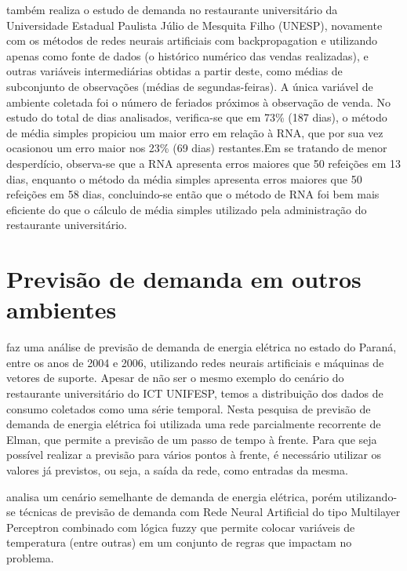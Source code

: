           também realiza o estudo de demanda no restaurante universitário da Universidade Estadual Paulista Júlio de Mesquita Filho (UNESP), novamente com os métodos de redes neurais artificiais com backpropagation e utilizando apenas como fonte de dados (o histórico numérico das vendas realizadas), e outras variáveis intermediárias obtidas a partir deste, como médias de subconjunto de observações (médias de segundas-feiras). A única variável de ambiente coletada foi o número de feriados próximos à observação de venda. No estudo do total de dias analisados, verifica-se que em 73\% (187 dias), o método de média simples propiciou um maior erro em relação à RNA, que por sua vez ocasionou um erro maior nos 23\% (69 dias) restantes.Em se tratando de menor desperdício, observa-se que a RNA apresenta erros maiores que 50 refeições em 13 dias, enquanto o método da média simples apresenta erros maiores que 50 refeições em 58 dias, concluindo-se então que o método de RNA foi bem mais eficiente do que o cálculo de média simples utilizado pela administração do restaurante universitário.
      
      \section{Previsão de demanda em outros ambientes}
          faz uma análise de previsão de demanda de energia elétrica no estado do Paraná, entre os anos de 2004 e 2006, utilizando redes neurais artificiais e máquinas de vetores de suporte. Apesar de não ser o mesmo exemplo do cenário do restaurante universitário do ICT UNIFESP, temos a distribuição dos dados de consumo coletados como uma série temporal. Nesta pesquisa de previsão de demanda de energia elétrica foi utilizada uma rede parcialmente recorrente de Elman, que permite a previsão de um passo de tempo à frente. Para que seja possível realizar a previsão para vários pontos à frente, é necessário utilizar os valores já previstos, ou seja, a saída da rede, como entradas da mesma.
        
          analisa um cenário semelhante de demanda de energia elétrica, porém utilizando-se técnicas de previsão de demanda com Rede Neural Artificial do tipo Multilayer Perceptron combinado com lógica fuzzy que permite colocar variáveis de temperatura (entre outras) em um conjunto de regras que impactam no problema.
        
